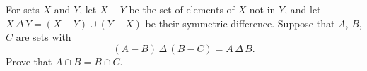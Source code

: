 For sets $X$ and $Y$, let $X-Y$ be the set of elements of $X$ not in $Y$, and let $X\,\Delta\,Y=(X-Y)\cup(Y-X)$ be their symmetric difference. Suppose that $A$, $B$, $C$ are sets with
\[(A-B)\,\Delta\,(B-C)=A\,\Delta\,B .\]
Prove that $A\cap B=B\cap C$.
